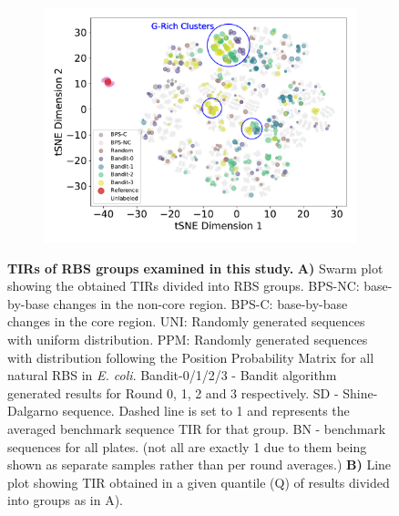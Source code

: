\documentclass{article}
\begin{document}
\begin{figure}[!ht]
\begin{subfigure}[b]{0.48\textwidth}
    \end{subfigure}
    \begin{subfigure}[b]{0.48\textwidth}
        \centering
        \caption{}
        \includegraphics[scale=0.42]{plots/Main_Paper/tsneplot.pdf}
    \end{subfigure}
    \caption{
    \textbf{TIRs of RBS groups examined in this study.}
    \textbf{A)} Swarm plot showing the obtained TIRs divided into RBS groups.
    BPS-NC: base-by-base changes in the non-core region.
    BPS-C: base-by-base changes in the core region.
    UNI: Randomly generated sequences with uniform distribution.
    PPM: Randomly generated sequences with distribution following the Position Probability Matrix for all natural RBS in \emph{E. coli}.
    Bandit-0/1/2/3 - Bandit algorithm generated results for Round 0, 1, 2 and 3 respectively.
    SD - Shine-Dalgarno sequence.
    Dashed line is set to 1 and represents the averaged benchmark sequence TIR for that group.
    BN - benchmark sequences for all plates.
    (not all are exactly 1 due to them being shown as separate samples rather than per round averages.)
    \textbf{B)} Line plot showing TIR obtained in a given quantile (Q) of results divided into groups as in A).
}
\end{figure}
\end{document}
